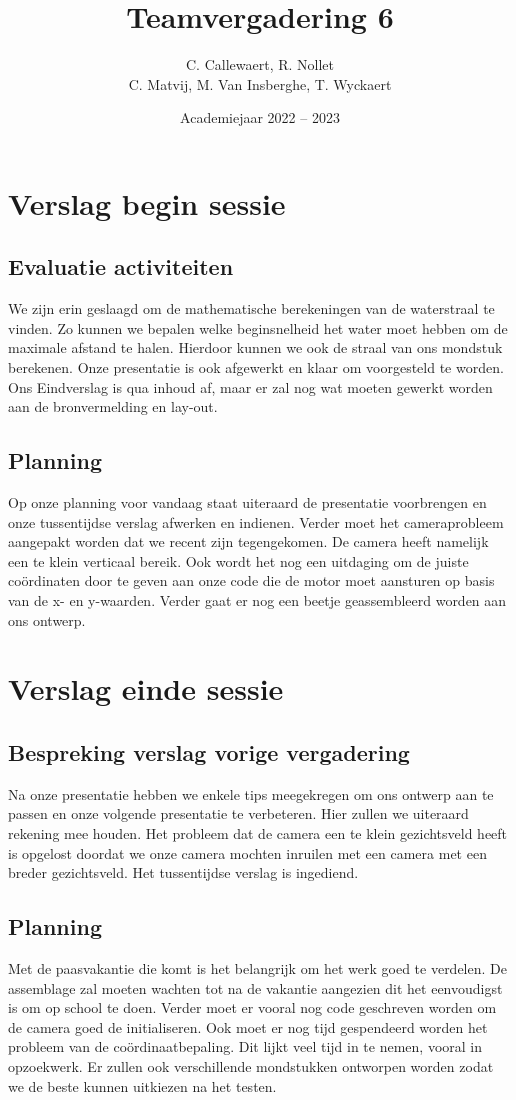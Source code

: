 \documentclass{kulakarticle}
\title{Teamvergadering 6}
\author{C. Callewaert, R. Nollet \\
	C. Matvij, M. Van Insberghe, T. Wyckaert }
\date{Academiejaar 2022 -- 2023}
\begin{document}
	\maketitle
	\section{Verslag begin sessie}
	
	\subsection{Evaluatie activiteiten}
	We zijn erin geslaagd om de mathematische berekeningen van de waterstraal te vinden. Zo kunnen we bepalen welke beginsnelheid het water moet hebben om de maximale afstand te halen. Hierdoor kunnen we ook de straal van ons mondstuk berekenen. Onze presentatie is ook afgewerkt en klaar om voorgesteld te worden. Ons Eindverslag is qua inhoud af, maar er zal nog wat moeten gewerkt worden aan de bronvermelding en lay-out.
	 
	
	\subsection{Planning}
	Op onze planning voor vandaag staat uiteraard de presentatie voorbrengen en onze tussentijdse verslag afwerken en indienen. Verder moet het cameraprobleem aangepakt worden dat we recent zijn tegengekomen. De camera heeft namelijk een te klein verticaal bereik. Ook wordt het nog een uitdaging om de juiste coördinaten door te geven aan onze code die de motor moet aansturen op basis van de x- en y-waarden. Verder gaat er nog een beetje geassembleerd worden aan ons ontwerp.

	
	\section{Verslag einde sessie}
	
	\subsection{Bespreking verslag vorige vergadering}
	Na onze presentatie hebben we enkele tips meegekregen om ons ontwerp aan te passen en onze volgende presentatie te verbeteren. Hier zullen we uiteraard rekening mee houden. Het probleem dat de camera een te klein gezichtsveld heeft is opgelost doordat we onze camera mochten inruilen met een camera met een breder gezichtsveld. Het tussentijdse verslag is ingediend.
	\subsection{Planning}
	Met de paasvakantie die komt is het belangrijk om het werk goed te verdelen. De assemblage zal moeten wachten tot na de vakantie aangezien dit het eenvoudigst is om op school te doen. Verder moet er vooral nog code geschreven worden om de camera goed de initialiseren. Ook moet er nog tijd gespendeerd worden het probleem van de coördinaatbepaling. Dit lijkt veel tijd in te nemen, vooral in opzoekwerk. Er zullen ook verschillende mondstukken ontworpen worden zodat we de beste kunnen uitkiezen na het testen.


	

	
\end{document}
